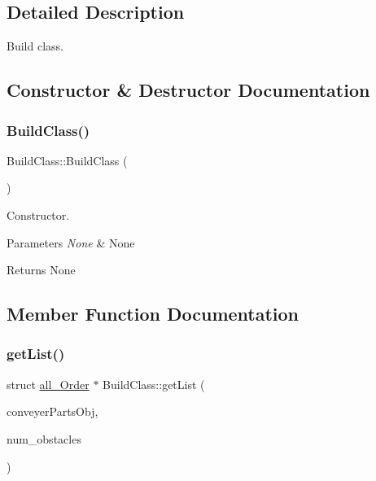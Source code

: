 \subsection{Detailed Description}
Build class. 

\subsection{Constructor \& Destructor Documentation}
\mbox{\label{classBuildClass_a03e935abdeb4b19d3e233dc6aa70f885}} 
\subsubsection{\texorpdfstring{Build\+Class()}{BuildClass()}}
{\footnotesize\ttfamily Build\+Class\+::\+Build\+Class (\begin{DoxyParamCaption}{ }\end{DoxyParamCaption})\hspace{0.3cm}{\ttfamily [inline]}}



Constructor. 


\begin{DoxyParams}{Parameters}
{\em None} & None \\
\hline
\end{DoxyParams}
\begin{DoxyReturn}{Returns}
None 
\end{DoxyReturn}


\subsection{Member Function Documentation}
\mbox{\label{classBuildClass_afd4c97bb10d023ce4f6a6b15b88171a6}} 
\subsubsection{\texorpdfstring{get\+List()}{getList()}}
{\footnotesize\ttfamily struct \hyperlink{structall__Order}{all\+\_\+\+Order} $\ast$ Build\+Class\+::get\+List (\begin{DoxyParamCaption}\item[{\hyperlink{classConveyerParts}{Conveyer\+Parts} \&}]{conveyer\+Parts\+Obj,  }\item[{int}]{num\+\_\+obstacles }\end{DoxyParamCaption})}



